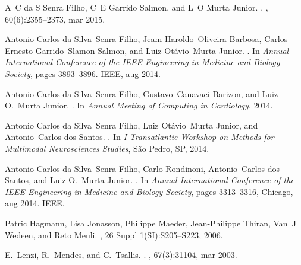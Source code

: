 \documentclass{InsightArticle}
\begin{document}
\begin{thebibliography}{10}

A~C {da S Senra Filho}, C~E {Garrido Salmon}, and L~O {Murta Junior}.
.
, 60(6):2355--2373, mar 2015.

Antonio Carlos da Silva~Senra Filho, Jeam Haroldo~Oliveira Barbosa, Carlos
  Ernesto Garrido~Slamon Salmon, and Luiz Ot{\'{a}}vio~Murta Junior.
.
\newblock In {\em Annual International Conference of the IEEE Engineering in
  Medicine and Biology Society}, pages 3893--3896. IEEE, aug 2014.

Antonio Carlos da Silva~Senra Filho, Gustavo~Canavaci Barizon, and Luiz
  O.~Murta Junior.
.
\newblock In {\em Annual Meeting of Computing in Cardiology}, 2014.

Antonio Carlos da Silva~Senra Filho, Luiz Ot{\'{a}}vio~Murta Junior, and
  Antonio~Carlos dos Santos.
.
\newblock In {\em I Transatlantic Workshop on Methods for Multimodal
  Neurosciences Studies}, S{\~{a}}o Pedro, SP, 2014.

Antonio Carlos da Silva~Senra Filho, Carlo Rondinoni, Antonio~Carlos dos
  Santos, and Luiz O.~Murta Junior.
.
\newblock In {\em Annual International Conference of the IEEE Engineering in
  Medicine and Biology Society}, pages 3313--3316, Chicago, aug 2014. IEEE.

Patric Hagmann, Lisa Jonasson, Philippe Maeder, Jean-Philippe Thiran, Van~J
  Wedeen, and Reto Meuli.
, 26 Suppl 1(SI):S205--S223, 2006.

E.~Lenzi, R.~Mendes, and C.~Tsallis.
.
, 67(3):31104, mar 2003.


\end{thebibliography}
\end{document}
